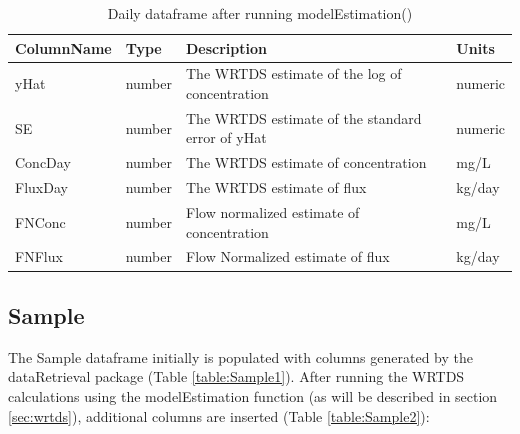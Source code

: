 \documentclass[a4paper,11pt]{article}\usepackage[]{graphicx}\usepackage[]{color}
\begin{document}
\begin{table}[!ht]
\centering
\caption{Daily dataframe after running modelEstimation()} 
\label{table:Daily2}
\begin{tabular}{llll}
  \hline
ColumnName & Type & Description & Units \\ 
  \hline
yHat & number & The WRTDS estimate of the log of concentration & numeric \\ 
  SE & number & The WRTDS estimate of the standard error of yHat & numeric \\ 
  ConcDay & number & The WRTDS estimate of concentration & mg/L \\ 
  FluxDay & number & The WRTDS estimate of flux & kg/day \\ 
  FNConc & number & Flow normalized estimate of concentration & mg/L \\ 
  FNFlux & number & Flow Normalized estimate of flux & kg/day \\ 
   \hline
\end{tabular}
\end{table}

\FloatBarrier
\pagebreak


\subsection{Sample}
\label{sec:dataframesSample}
The Sample dataframe initially is populated with columns generated by the dataRetrieval package (Table \ref{table:Sample1}). After running the WRTDS calculations using the modelEstimation function (as will be described in section \ref{sec:wrtds}), additional columns are inserted (Table \ref{table:Sample2}):
\end{document}
